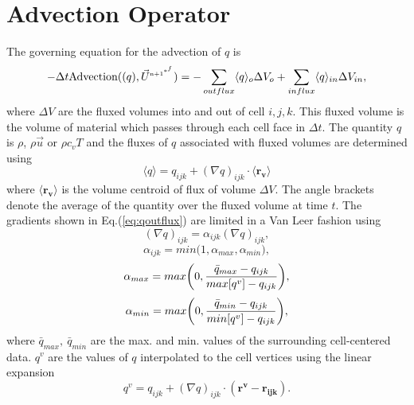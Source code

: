 \documentclass[fleqn]{article}
\newcommand{\nadv}      {\text{\tiny{n+1}}}
\newcommand{\delt}      {\ensuremath{\Delta{t}} }
\newcommand{\ustar}     {\ensuremath{\vec{U}^{\nadv^{*^{f}}}}}
\begin{document}
\section*{\small{Advection Operator}}
The governing equation for the advection of $q$ is
\begin{equation*}
    - \delt \text{Advection}((q), \ustar) = 
-   \sum_{outflux} \langle{q}\rangle_o \Delta{V_o} 
+   \sum_{influx} \langle{q}\rangle_{in} \Delta{V_{in}},
    \label{eq:advect.main}
\end{equation*}
%
where $\Delta V$ are the fluxed volumes into and out of cell $i,j,k$.
This fluxed volume is the volume of material which passes through each cell
face in $\delt$. The quantity $q$ is $\rho$, $\rho \vec{u}$
or $\rho c_v T$ and the fluxes of $q$ associated with fluxed volumes are
determined using
%
\begin{equation}
\label{eq:qoutflux}
    \langle{q}\rangle = q_{ijk} + (\nabla q)_{ijk} \cdot \langle \mathbf{r_{v}} \rangle
\end{equation}
%
where $\mathbf{\langle r_{v} \rangle}$ is the volume centroid of flux of volume
$\Delta V$.  The angle brackets denote the average of the quantity over the
fluxed volume at time $t$.  The gradients shown in Eq.(\ref{eq:qoutflux})
are limited in a Van Leer fashion using  \\
%
%
\begin{equation*}
    (\nabla q)_{ijk} = \alpha_{ijk}(\nabla q)_{ijk},
\end{equation*}
%
%
\begin{equation*}
    \alpha_{ijk} = min\biggl( 1, \alpha_{max}, \alpha_{min} \biggr),
\end{equation*}
%
%
\begin{equation*}
    \alpha_{max} = max\biggl{(} 0, \frac{\bar{q}_{max} - q_{ijk}}{max[q^v] - q_{ijk}}\biggr{)},
\end{equation*}
%
%
\begin{equation*}
    \alpha_{min} = max\biggl{(} 0, \frac{\bar{q}_{min} - q_{ijk}}{min[q^v] - q_{ijk}}\biggr{)},
\end{equation*}
%
%
where $\bar{q}_{max},~\bar{q}_{min}$ are the max. and min. values of the
surrounding cell-centered data.  $q^v$ are the values of $q$ interpolated
to the cell vertices using the linear expansion
%
%
\begin{equation*}
    \label{eq:vertex}
    q^v = q_{ijk} + (\nabla q)_{ijk} \cdot  (\mathbf{r^{v} - r_{ijk}} ).
\end{equation*}
\end{document}
